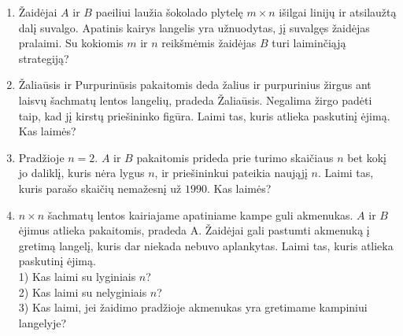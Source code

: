 \begin{enumerate}

\item Žaidėjai $A$ ir $B$ paeiliui laužia šokolado plytelę  $m\times n$ išilgai
  linijų ir atsilaužtą dalį suvalgo. Apatinis kairys langelis yra
  užnuodytas, jį suvalgęs žaidėjas pralaimi. Su kokiomis $m$ ir $n$ reikšmėmis
  žaidėjas $B$ turi laiminčiąją strategiją? 


\item Žaliaūsis ir Purpurinūsis pakaitomis deda žalius ir purpurinius žirgus ant laisvų šachmatų lentos langelių, pradeda Žaliaūsis. Negalima žirgo padėti taip, kad jį kirstų priešininko figūra. Laimi tas, kuris atlieka paskutinį ėjimą. Kas laimės?


\item Pradžioje $n=2$. $A$ ir $B$ pakaitomis prideda prie turimo skaičiaus $n$ bet kokį jo daliklį, kuris nėra lygus $n$, ir priešininkui pateikia naująjį $n$. Laimi tas, kuris parašo skaičių nemažesnį už $1990$. Kas laimės?


\item  $n\times n$ šachmatų lentos kairiajame apatiniame kampe guli akmenukas. $A$ ir $B$ ėjimus atlieka pakaitomis, pradeda A. Žaidėjai gali pastumti akmenuką į gretimą langelį, kuris dar niekada nebuvo aplankytas. Laimi tas, kuris atlieka paskutinį ėjimą.\\
  1) Kas laimi su lyginiais $n$? \\
  2) Kas laimi su nelyginiais $n$? \\
  3) Kas laimi, jei žaidimo pradžioje akmenukas yra gretimame kampiniui langelyje?


\end{enumerate}
